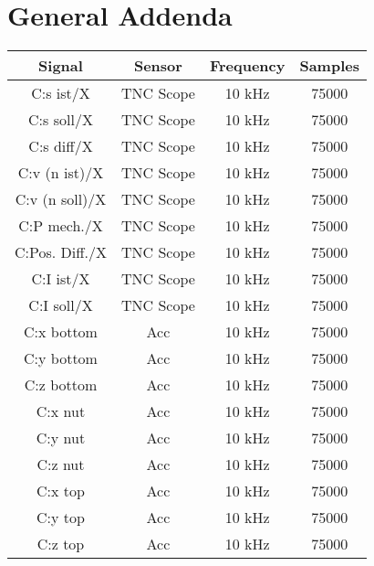 \chapter{General Addenda}



\begin{center}
\begin{longtable}{c c c c} 
 \toprule
 Signal & Sensor & Frequency & Samples \\ [0.5ex] 
 \midrule
 C:s ist/X & TNC Scope & 10 kHz & 75000 \\ 

 C:s soll/X & TNC Scope & 10 kHz & 75000 \\ 

 C:s diff/X & TNC Scope & 10 kHz & 75000 \\ 

 C:v (n ist)/X & TNC Scope & 10 kHz & 75000 \\ 

 C:v (n soll)/X& TNC Scope & 10 kHz & 75000 \\ 

 C:P mech./X & TNC Scope & 10 kHz & 75000 \\ 

 C:Pos. Diff./X & TNC Scope & 10 kHz & 75000 \\ 

 C:I ist/X & TNC Scope & 10 kHz & 75000 \\ 

 C:I soll/X & TNC Scope & 10 kHz & 75000 \\ 

 C:x bottom & Acc & 10 kHz & 75000 \\ 

 C:y bottom & Acc & 10 kHz & 75000 \\ 

 C:z bottom & Acc & 10 kHz & 75000 \\ 

 C:x nut & Acc & 10 kHz & 75000 \\ 

 C:y nut & Acc & 10 kHz & 75000 \\ 

 C:z nut & Acc & 10 kHz & 75000 \\ 

 C:x top & Acc & 10 kHz & 75000 \\ 

 C:y top & Acc & 10 kHz & 75000 \\ 

 C:z top & Acc & 10 kHz & 75000 \\ 


\end{longtable}
\end{center}
